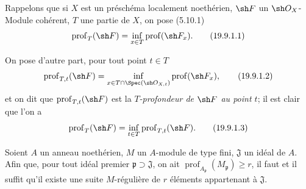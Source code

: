 
\begin{env}[19.9.1]
\label{IV.19.9.1}
Rappelons que si $X$ est un préschéma localement noethérien, $\sh F$ un $\sh O_X$-Module cohérent, $T$ une partie de $X$, on pose (5.10.1)
\begin{equation}
  \operatorname{prof}_T(\sh F)=\inf_{x\in T}\operatorname{prof}(\sh F_x).
  \tag{19.9.1.1}\label{IV.19.9.1.1}
\end{equation}

On pose d'autre part, pour tout point $t\in T$
\begin{equation}
  \operatorname{prof}_{T,t}(\sh F)=\inf_{x\in T\cap\Spec(\sh O_{X,t})}\operatorname{prof}(\sh F_x),
  \tag{19.9.1.2}\label{IV.19.9.1.2}
\end{equation}
et on dit que $\operatorname{prof}_{T,t}(\sh F)$ est la \emph{$T$-profondeur de $\sh F$ au point $t$}; il est clair que l'on a
\begin{equation}
  \operatorname{prof}_T(\sh F)=\inf_{t\in T}\operatorname{prof}_{T,t}(\sh F).
  \tag{19.9.1.3}\label{IV.19.9.1.3}
\end{equation}
\end{env}

\begin{lemma}[19.9.2]
\label{IV.19.9.2}
Soient $A$ un anneau noethérien, $M$ un $A$-module de type fini, $\mathfrak J$ un idéal de $A$. Afin que, pour tout idéal premier $\mathfrak p\supset\mathfrak J$, on ait $\operatorname{prof}_{A_{\mathfrak p}}(M_{\mathfrak p})\geq r$, il faut et il suffit qu'il existe une suite $M$-régulière de $r$ éléments appartenant à $\mathfrak J$.
\end{lemma}

